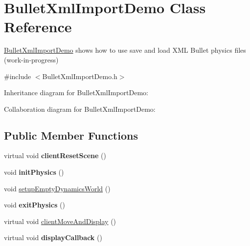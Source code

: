 \hypertarget{class_bullet_xml_import_demo}{\section{Bullet\+Xml\+Import\+Demo Class Reference}
\label{class_bullet_xml_import_demo}
}


\hyperlink{class_bullet_xml_import_demo}{Bullet\+Xml\+Import\+Demo} shows how to use save and load X\+M\+L Bullet physics files (work-\/in-\/progress)  




{\ttfamily \#include $<$Bullet\+Xml\+Import\+Demo.\+h$>$}



Inheritance diagram for Bullet\+Xml\+Import\+Demo\+:


Collaboration diagram for Bullet\+Xml\+Import\+Demo\+:
\subsection*{Public Member Functions}
\begin{DoxyCompactItemize}
\item 
\hypertarget{class_bullet_xml_import_demo_a327fda026419d6beb04f7b4c5f852431}{virtual void {\bfseries client\+Reset\+Scene} ()}\label{class_bullet_xml_import_demo_a327fda026419d6beb04f7b4c5f852431}

\item 
\hypertarget{class_bullet_xml_import_demo_a160f08dd08993dbc251b04b53f049a9d}{void {\bfseries init\+Physics} ()}\label{class_bullet_xml_import_demo_a160f08dd08993dbc251b04b53f049a9d}

\item 
void \hyperlink{class_bullet_xml_import_demo_aba725e8314b13160323d4d3a7477774f}{setup\+Empty\+Dynamics\+World} ()
\item 
\hypertarget{class_bullet_xml_import_demo_aa0b3331a5f19554095dc25457cc28a9f}{void {\bfseries exit\+Physics} ()}\label{class_bullet_xml_import_demo_aa0b3331a5f19554095dc25457cc28a9f}

\item 
virtual void \hyperlink{class_bullet_xml_import_demo_ab4a303d532a18914d8e52ca592b2a571}{client\+Move\+And\+Display} ()
\item 
\hypertarget{class_bullet_xml_import_demo_a1ed8d282039536e5292a5175aa9b8f48}{virtual void {\bfseries display\+Callback} ()}\label{class_bullet_xml_import_demo_a1ed8d282039536e5292a5175aa9b8f48}

\end{DoxyCompactItemize}
